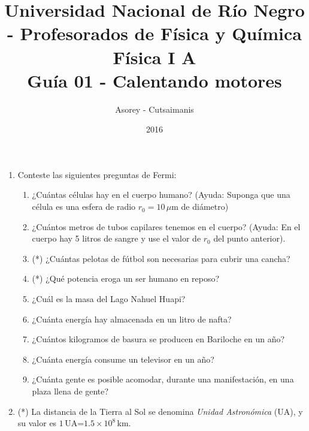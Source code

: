 \documentclass[a4paper,12pt]{article}
\begin{document}
\title{
{\normalsize{Universidad Nacional de Río Negro - Profesorados de Física y Química}}\\
Física I A \\ Guía 01 - Calentando motores\\}
\author{Asorey - Cutsaimanis}
\date{2016}
\maketitle

\begin{enumerate}
\setcounter{enumi}{0}      %

\item Conteste las siguientes preguntas de Fermi:

\begin{enumerate}
\item ¿Cuántas células hay en el cuerpo humano? (Ayuda: Suponga que una célula
es una esfera de radio $r_0=10$\,$\mu$m de diámetro)
\item ¿Cuántos metros de tubos capilares tenemos en el cuerpo? (Ayuda: En el
cuerpo hay 5 litros de sangre y use el valor de $r_0$ del punto anterior).
\item (*) ¿Cuántas pelotas de fútbol son necesarias para cubrir una cancha?
\item (*) ¿Qué potencia eroga un ser humano en reposo?
\item ¿Cuál es la masa del Lago Nahuel Huapi?
\item ¿Cuánta energía hay almacenada en un litro de nafta?
\item ¿Cuántos kilogramos de basura se producen en Bariloche en un año?
\item ¿Cuánta energía consume un televisor en un año?
\item ¿Cuánta gente es posible acomodar, durante una manifestación, en una
plaza llena de gente?

\end{enumerate}

\item (*) La distancia de la Tierra al Sol se denomina {\emph {Unidad
	Astronómica}} (UA), y su valor es $1$\,UA=$1.5\times10^8$\,km. 


\end{enumerate}
\end{document}
